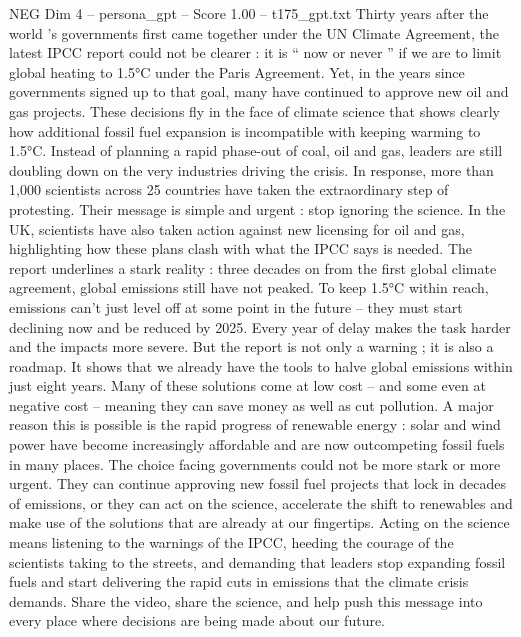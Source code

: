 \begin{textsample}{NEG Dim 4 – persona\_gpt – Score 1.00 – t175\_gpt.txt}  \label{ex:f4_neg_040}
Thirty years after the world ’s governments first came together under the UN Climate Agreement, the latest IPCC report could not be clearer : it is “ now or never ” if we are to limit global heating to 1.5°C under the Paris Agreement.
Yet, in the years since governments signed up to that goal, many have continued to approve new oil and gas projects.
These decisions fly in the face of climate science that shows clearly how additional fossil fuel expansion is incompatible with keeping warming to 1.5°C.
Instead of planning a rapid phase-out of coal, oil and gas, leaders are still doubling down on the very industries driving the crisis.
In response, more than 1,000 scientists across 25 countries have taken the extraordinary step of protesting.
Their message is simple and urgent : stop ignoring the science.
In the UK, scientists have also taken action against new licensing for oil and gas, highlighting how these plans clash with what the IPCC says is needed.
The report underlines a stark reality : three decades on from the first global climate agreement, global emissions still have not peaked.
To keep 1.5°C within reach, emissions can't just level off at some point in the future – they must start declining now and be reduced by 2025.
Every year of delay makes the task harder and the impacts more severe.
But the report is not only a warning ; it is also a roadmap.
It shows that we already have the tools to halve global emissions within just eight years.
Many of these solutions come at low cost – and some even at negative cost – meaning they can save money as well as cut pollution.
A major reason this is possible is the rapid progress of renewable energy : solar and wind power have become increasingly affordable and are now outcompeting fossil fuels in many places.
The choice facing governments could not be more stark or more urgent.
They can continue approving new fossil fuel projects that lock in decades of emissions, or they can act on the science, accelerate the shift to renewables and make use of the solutions that are already at our fingertips.
Acting on the science means listening to the warnings of the IPCC, heeding the courage of the scientists taking to the streets, and demanding that leaders stop expanding fossil fuels and start delivering the rapid cuts in emissions that the climate crisis demands.
Share the video, share the science, and help push this message into every place where decisions are being made about our future.

\end{textsample}
